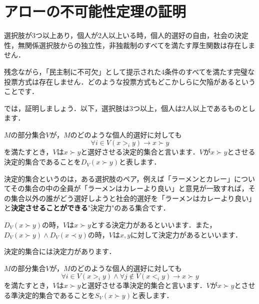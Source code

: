 \section{アローの不可能性定理の証明}
\begin{thm}[アローの不可能性定理]\label{thm:41}
    選択肢が3つ以上あり，個人が2人以上いる時，個人的選好の自由，社会の決定性，無関係選択肢からの独立性，非独裁制のすべてを満たす厚生関数は存在しません．
\end{thm}

残念ながら，「民主制に不可欠」として提示された4条件のすべてを満たす完璧な投票方式は存在しません．どのような投票方式もどこかしらに欠陥があるということです．

では，証明しましょう．以下，選択肢は3つ以上，個人は2人以上であるものとします．

\begin{dfn}[決定的集合]
    $M$の部分集合$V$が，$M$のどのような個人的選好に対しても
    \begin{equation*}
        \forall i \in V ( x >_i y) \to x \succ y 
    \end{equation*}
    を満たすとき，$V$は$x \succ y$と選好させる決定的集合と言います．$V$が$x \succ y$とさせる決定的集合であることを$D_V(x \succ y)$と表します．
\end{dfn}

決定的集合というのは，ある選択肢のペア，例えば「ラーメンとカレー」についてその集合の中の全員が「ラーメンはカレーより良い」と意見が一致すれば，その集合以外の誰がどう選好しようと社会的選好を「ラーメンはカレーより良い」と{\bf 決定させることができる}"決定力"のある集合です．

\begin{dfn}[決定力]
    $D_V(x \succ y)$の時，$V$は$x \succ y$とする決定力があるといいます．また，$D_V(x \succ y) \land D_V(x \prec y)$の時，$V$は$x,y$に対して決定力があるといいます．
\end{dfn}

決定的集合には決定力があります．

\begin{dfn}[準決定的集合]
    $M$の部分集合$V$が，$M$のどのような個人的選好に対しても
    \begin{equation*}
        \forall i \in V ( x >_i y ) \land \forall j \not \in V ( x <_i y) \to x \succ y
    \end{equation*}
    を満たすとき，$V$は$x \succ y$と選好させる準決定的集合と言います．$V$が$x \succ y$とさせる準決定的集合であることを$S_V(x \succ y)$と表します．
\end{dfn}

